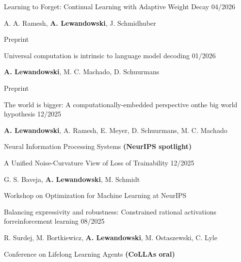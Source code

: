   \vspace{-4mm}
\begin{cventries}

    \pubentry
    {Learning to Forget: Continual Learning with Adaptive Weight Decay}
    {04/2026}
    {
      \vspace{-4.0mm}
      \begin{cvitems}
        \item[>>]  A. A. Ramesh, \textbf{A. Lewandowski}, J. Schmidhuber
    	\item[>>] Preprint
      \end{cvitems}
    }

    \pubentry
    {Universal computation is intrinsic to language model decoding}
    {01/2026}
    {
      \vspace{-4.0mm}
      \begin{cvitems}
        \item[>>]  \textbf{A. Lewandowski}, M. C. Machado, D. Schuurmans
    	\item[>>] Preprint
      \end{cvitems}
    }

    \pubentry
    {The world is bigger: A computationally-embedded perspective on\newline the big world hypothesis}
    {12/2025}
    {
      \vspace{-4.0mm}
      \begin{cvitems}
        \item[>>] \textbf{A. Lewandowski}, A. Ramesh, E. Meyer,  D. Schuurmans, M. C. Machado
    	\item[>>] Neural Information Processing Systems \textbf{(NeurIPS spotlight)}
      \end{cvitems}
    }

    \pubentry
    {A Unified Noise-Curvature View of Loss of Trainability}
    {12/2025}
    {
      \vspace{-4.0mm}
      \begin{cvitems}
        \item[>>] G. S. Baveja, \textbf{A. Lewandowski}, M. Schmidt
    	\item[>>] Workshop on Optimization for Machine Learning at NeurIPS
      \end{cvitems}
    }

    \pubentry
    {Balancing expressivity and robustness: Constrained rational activations for\newline reinforcement learning}
    {08/2025}
    {
      \vspace{-4.0mm}
      \begin{cvitems}
        \item[>>]   R. Surdej, M. Bortkiewicz, \textbf{A. Lewandowski}, M. Ostaszewski, C. Lyle 
    	\item[>>] Conference on Lifelong Learning Agents \textbf{(CoLLAs oral)}
      \end{cvitems}
    }


\end{cventries}
